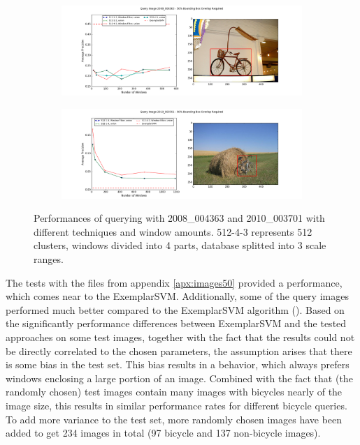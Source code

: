\begin{figure}
\begin{subfigure}{\textwidth}
\centering
\includegraphics[width=\textwidth]{images/db1_window_comparison-2008_004363}
\end{subfigure}

\begin{subfigure}{\textwidth}
\centering
\includegraphics[width=\textwidth]{images/db1_window_comparison-2010_003701}
\end{subfigure}
\caption[Performances of querying with 2008\_004363 and 2010\_003701 with different techniques and window amounts]{Performances of querying with 2008\_004363 and 2010\_003701 with different techniques and window amounts. 512-4-3 represents 512 clusters, windows divided into 4 parts, database splitted into 3 scale ranges.}
\label{fig:performance_query_params}
\end{figure}


The tests with the files from appendix \ref{apx:images50} provided a performance, which comes near to the ExemplarSVM. Additionally, some of the query images performed much better compared to the ExemplarSVM algorithm (). Based on the significantly performance differences between ExemplarSVM and the tested approaches on some test images, together with the fact that the results could not be directly correlated to the chosen parameters, the assumption arises that there is some bias in the test set. This bias results in a behavior, which always prefers windows enclosing a large portion of an image. Combined with the fact that (the randomly chosen) test images contain many images with bicycles nearly of the image size, this results in similar performance rates for different bicycle queries. To add more variance to the test set, more randomly chosen images have been added to get 234 images in total (97 bicycle and 137 non-bicycle images).

